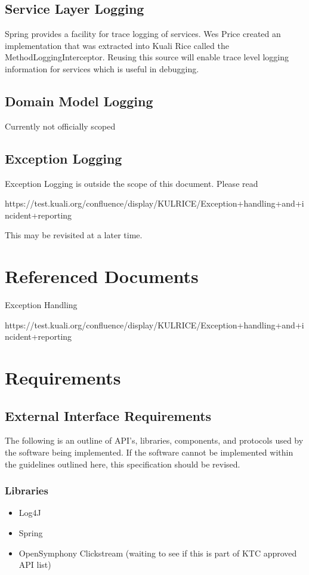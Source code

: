 \documentclass[12pt]{report}
\begin{document}
\subsection{Service Layer Logging}
Spring provides a facility for trace logging of services. Wes Price created an implementation that was extracted into
Kuali Rice called the MethodLoggingInterceptor. Reusing this source will enable trace level logging information for 
services which is useful in debugging.

\subsection{Domain Model Logging}
Currently not officially scoped

\subsection{Exception Logging}
Exception Logging is outside the scope of this document. Please read 

https://test.kuali.org/confluence/display/KULRICE/Exception+handling+and+incident+reporting

This may be revisited at a later time.

\section{Referenced Documents}
Exception Handling
 
https://test.kuali.org/confluence/display/KULRICE/Exception+handling+and+incident+reporting

\section{Requirements}
\subsection{External Interface Requirements}
The following is an outline of API's, libraries, components, and protocols used by the software being implemented. If the software
cannot be implemented within the guidelines outlined here, this specification should be revised.

\subsubsection{Libraries}
\begin{itemize}
\item Log4J
\item Spring
\item OpenSymphony Clickstream (waiting to see if this is part of KTC approved API list)
\end{itemize}
\end{document}
